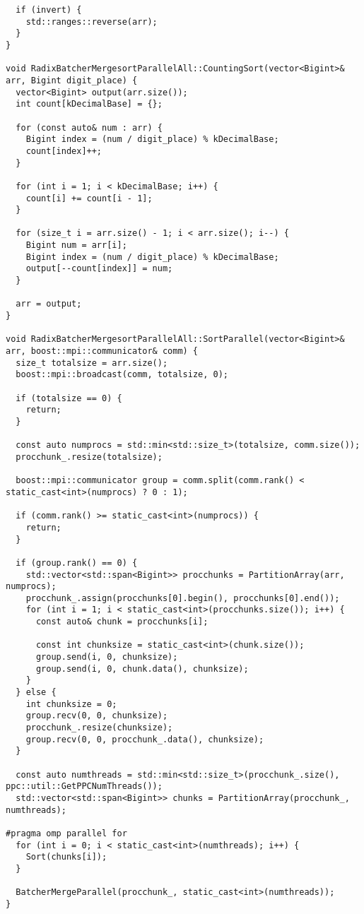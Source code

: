 \documentclass[a4paper,12pt]{article}
\begin{document}
\begin{lstlisting}
  if (invert) {
    std::ranges::reverse(arr);
  }
}

void RadixBatcherMergesortParallelAll::CountingSort(vector<Bigint>& arr, Bigint digit_place) {
  vector<Bigint> output(arr.size());
  int count[kDecimalBase] = {};

  for (const auto& num : arr) {
    Bigint index = (num / digit_place) % kDecimalBase;
    count[index]++;
  }

  for (int i = 1; i < kDecimalBase; i++) {
    count[i] += count[i - 1];
  }

  for (size_t i = arr.size() - 1; i < arr.size(); i--) {
    Bigint num = arr[i];
    Bigint index = (num / digit_place) % kDecimalBase;
    output[--count[index]] = num;
  }

  arr = output;
}

void RadixBatcherMergesortParallelAll::SortParallel(vector<Bigint>& arr, boost::mpi::communicator& comm) {
  size_t totalsize = arr.size();
  boost::mpi::broadcast(comm, totalsize, 0);

  if (totalsize == 0) {
    return;
  }

  const auto numprocs = std::min<std::size_t>(totalsize, comm.size());
  procchunk_.resize(totalsize);

  boost::mpi::communicator group = comm.split(comm.rank() < static_cast<int>(numprocs) ? 0 : 1);

  if (comm.rank() >= static_cast<int>(numprocs)) {
    return;
  }

  if (group.rank() == 0) {
    std::vector<std::span<Bigint>> procchunks = PartitionArray(arr, numprocs);
    procchunk_.assign(procchunks[0].begin(), procchunks[0].end());
    for (int i = 1; i < static_cast<int>(procchunks.size()); i++) {
      const auto& chunk = procchunks[i];

      const int chunksize = static_cast<int>(chunk.size());
      group.send(i, 0, chunksize);
      group.send(i, 0, chunk.data(), chunksize);
    }
  } else {
    int chunksize = 0;
    group.recv(0, 0, chunksize);
    procchunk_.resize(chunksize);
    group.recv(0, 0, procchunk_.data(), chunksize);
  }

  const auto numthreads = std::min<std::size_t>(procchunk_.size(), ppc::util::GetPPCNumThreads());
  std::vector<std::span<Bigint>> chunks = PartitionArray(procchunk_, numthreads);

#pragma omp parallel for
  for (int i = 0; i < static_cast<int>(numthreads); i++) {
    Sort(chunks[i]);
  }

  BatcherMergeParallel(procchunk_, static_cast<int>(numthreads));
}


\end{lstlisting}
\end{document}
